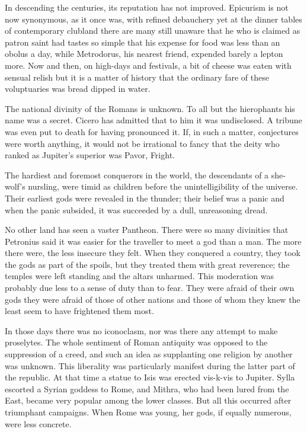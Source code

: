 \documentclass[]{book}
\begin{document}
In descending the centuries, its reputation has not improved. Epicurism
is not now synonymous, as it once was, with refined debauchery yet at
the dinner tables of contemporary clubland there are many still unaware
that he who is claimed as patron saint had tastes so simple that his
expense for food was less than an obolus a day, while Metrodorus, his
nearest friend, expended barely a lepton more. Now and then, on
high-days and festivals, a bit of cheese was eaten with sensual relish
but it is a matter of history that the ordinary fare of these
voluptuaries was bread dipped in water.

The national divinity of the Romans is unknown. To all but the
hierophants his name was a secret. Cicero has admitted that to him it
was undisclosed. A tribune was even put to death for having pronounced
it. If, in such a matter, conjectures were worth anything, it would not
be irrational to fancy that the deity who ranked as Jupiter's superior
was Pavor, Fright.

The hardiest and foremost conquerors in the world, the descendants of a
she-wolf's nursling, were timid as children before the unintelligibility
of the universe. Their earliest gods were revealed in the thunder; their
belief was a panic and when the panic subsided, it was succeeded by a
dull, unreasoning dread.

No other land has seen a vaster Pantheon. There were so many divinities
that Petronius said it was easier for the traveller to meet a god than a
man. The more there were, the less insecure they felt. When they
conquered a country, they took the gods as part of the spoils, but they
treated them with great reverence; the temples were left standing and
the altars unharmed. This moderation was probably due less to a sense of
duty than to fear. They were afraid of their own gods they were afraid
of those of other nations and those of whom they knew the least seem to
have frightened them most.

In those days there was no iconoclasm, nor was there any attempt to make
proselytes. The whole sentiment of Roman antiquity was opposed to the
suppression of a creed, and such an idea as supplanting one religion by
another was unknown. This liberality was particularly manifest during
the latter part of the republic. At that time a statue to Isis was
erected vis-k-vis to Jupiter. Sylla escorted a Syrian goddess to Rome,
and Mithra, who had been lured from the East, became very popular among
the lower classes. But all this occurred after triumphant campaigns.
When Rome was young, her gods, if equally numerous, were less concrete.
\end{document}
